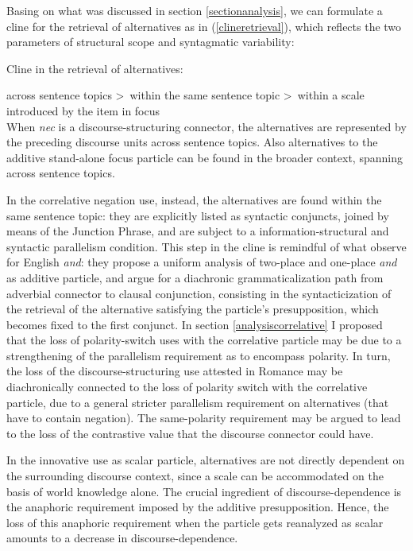 \documentclass[output=paper,modfonts,nonflat,citecolor=brown,
showindex
]{langsci/langscibook}
\begin{document}
Basing on what was discussed in section \ref{sectionanalysis}, we can formulate a cline for the retrieval of alternatives as in (\ref{clineretrieval}), which reflects the two parameters of structural scope and syntagmatic variability: 

{\begin{exe}
\ex \label{clineretrieval} Cline in the retrieval of alternatives:
\end{exe}}

\noindent across sentence topics \textgreater \ within the same sentence topic \textgreater \ within a scale introduced by the item in focus\\

\noindent When {\emph{nec}} is a discourse-structuring connector, the alternatives are represented by the preceding discourse units across sentence topics. Also alternatives to the additive stand-alone focus particle can be found in the broader context, spanning across sentence topics. 

In the correlative negation use, instead, the alternatives are found within the same sentence topic: they are explicitly listed as syntactic conjuncts, joined by means of the Junction Phrase, and are subject to a information-structural and syntactic parallelism condition. This step in the cline is remindful of what \citet{ZeevatJasinskaja07} observe for English {\emph{and}}: they propose a uniform analysis of two-place and one-place {\emph{and}} as additive particle, and argue for a diachronic grammaticalization path from adverbial connector to clausal conjunction, consisting in the syntacticization of the retrieval of the alternative satisfying the particle's presupposition, which becomes fixed to the first conjunct. In section \ref{analysiscorrelative} I proposed that the loss of polarity-switch uses with the correlative particle may be due to a strengthening of the parallelism requirement as to encompass polarity. In turn, the loss of the discourse-structuring use attested in Romance may be diachronically connected to the loss of polarity switch with the correlative particle, due to a general stricter parallelism requirement on alternatives (that have to contain negation). The same-polarity requirement may be argued to lead to the loss of the contrastive value that the discourse connector could have.

In the innovative use as scalar particle, alternatives are not directly dependent on the surrounding discourse context, since a scale can be accommodated on the basis of world knowledge alone. The crucial ingredient of discourse-dependence is the anaphoric requirement imposed by the additive presupposition. Hence, the loss of this anaphoric requirement when the particle gets reanalyzed as scalar amounts to a decrease in discourse-dependence.
\end{document}
